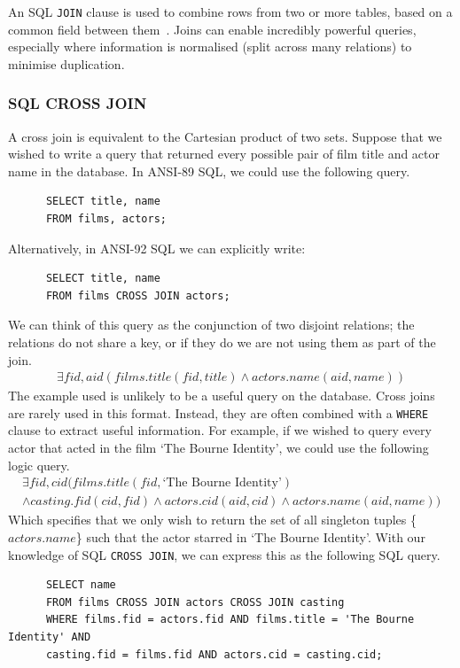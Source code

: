 \documentclass[a4paper, 11pt]{article}
\begin{document}
    An SQL \texttt{JOIN} clause is used to combine rows from two or more tables,
    based on a common field between them~\cite{w3JOINS}. Joins can enable
    incredibly powerful queries, especially where information is normalised
    (split across many relations) to minimise duplication.

    \subsubsection{SQL CROSS JOIN}
      A cross join is equivalent to the Cartesian product of two sets. Suppose
      that we wished to write a query that returned every possible pair of
      film title and actor name in the database. In ANSI-89 SQL, we could use
      the following query.
      \begin{verbatim}
      SELECT title, name
      FROM films, actors;
      \end{verbatim}
      Alternatively, in ANSI-92 SQL we can explicitly write:
      \begin{verbatim}
      SELECT title, name
      FROM films CROSS JOIN actors;
      \end{verbatim}
      We can think of this query as the conjunction of two disjoint relations;
      the relations do not share a key, or if they do we are not using them as
      part of the join.
      \begin{gather}
        \exists fid, aid(films.title(fid, title) \land actors.name(aid, name))
      \end{gather}
      The example used is unlikely to be a useful query on the database. Cross
      joins are rarely used in this format. Instead, they are often combined
      with a \texttt{WHERE} clause to extract useful information. For example,
      if we wished to query every actor that acted in the film `The Bourne
      Identity', we could use the following logic query.
      \begin{multline}
        \exists fid,cid(films.title(fid, \text{`The Bourne Identity'}) \\
        \land casting.fid(cid, fid) \land actors.cid(aid, cid) \land
          actors.name(aid, name))
      \end{multline}
      Which specifies that we only wish to return the set of all singleton
      tuples \{$actors.name$\} such that the actor starred in `The Bourne
      Identity'. With our knowledge of SQL \texttt{CROSS JOIN}, we can express
      this as the following SQL query.
      \begin{verbatim}
      SELECT name
      FROM films CROSS JOIN actors CROSS JOIN casting
      WHERE films.fid = actors.fid AND films.title = 'The Bourne Identity' AND
      casting.fid = films.fid AND actors.cid = casting.cid;
      \end{verbatim}
\end{document}
